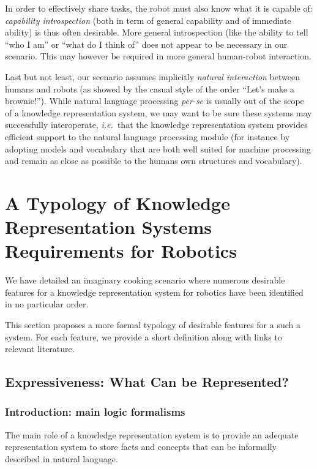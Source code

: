 \documentclass[a4paper, twocolumn]{article}
\newcommand{\ie}{{\textit{i.e.~}}}
\begin{document}
In order to effectively share tasks, the robot must also know what it is
capable of: \emph{capability introspection} (both in term of general capability
and of immediate ability) is thus often desirable. More general introspection
(like the ability to tell ``who I am'' or ``what do I think of'' does not
appear to be necessary in our scenario. This may however be required in more
general human-robot interaction.

Last but not least, our scenario assumes implicitly \emph{natural interaction}
between humans and robots (as showed by the casual style of the
order ``Let's make a brownie!''). While natural language processing {\it
per-se} is usually out of the scope of a knowledge representation system, we
may want to be sure these systems may successfully interoperate, \ie that the
knowledge representation system provides efficient support to the natural
language processing module (for instance by adopting models and vocabulary that
are both well suited for machine processing and remain as close as possible to
the humans own structures and vocabulary).

\section{A Typology of Knowledge Representation Systems Requirements for Robotics}
\label{sect|features}

We have detailed an imaginary cooking scenario where numerous desirable
features for a knowledge representation system for robotics have been
identified in no particular order.

This section proposes a more formal typology of desirable features for a such a
system. For each feature, we provide a short definition along with links to
relevant literature.

\subsection{Expressiveness: What Can be Represented?}
\label{sect|expressiveness}

\subsubsection{Introduction: main logic formalisms}

The main role of a knowledge representation system is to provide an adequate
representation system to store facts and concepts that can be informally
described in natural language.
\end{document}

